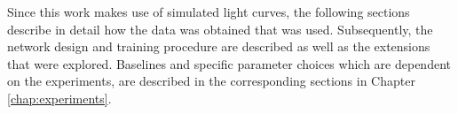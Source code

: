 
Since this work makes use of simulated light curves, the following sections describe in detail how the data was obtained that was used. Subsequently, the network design and training procedure are described as well as the extensions that were explored. Baselines and specific parameter choices which are dependent on the experiments, are described in the corresponding sections in Chapter \ref{chap:experiments}.
